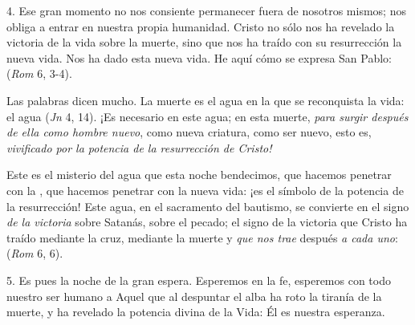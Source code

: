 \begin{body}
4. Ese gran momento no nos consiente permanecer fuera de nosotros mismos; nos obliga a entrar en nuestra propia humanidad. Cristo no sólo nos ha revelado la victoria de la vida sobre la muerte, sino que nos ha traído con su resurrección la nueva vida. Nos ha dado esta nueva vida. He aquí cómo se expresa San Pablo:  (\textit{Rom} 6, 3-4).

Las palabras  dicen mucho. La muerte es el agua en la que se reconquista la vida: el agua  (\textit{Jn} 4, 14). ¡Es necesario  en este agua; en esta muerte, \textit{para surgir después de ella como hombre nuevo}, como nueva criatura, como ser nuevo, esto es, \textit{vivificado por la potencia de la resurrección de Cristo!}

Este es el misterio del agua que esta noche bendecimos, que hacemos penetrar con la , que hacemos penetrar con la nueva vida: ¡es el símbolo de la potencia de la resurrección! Este agua, en el sacramento del bautismo, se convierte en el signo \textit{de la victoria} sobre Satanás, sobre el pecado; el signo de la victoria que Cristo ha traído mediante la cruz, mediante la muerte y \textit{que nos trae} después \textit{a cada uno}:  (\textit{Rom} 6, 6).

5. Es pues la noche de la gran espera. Esperemos en la fe, esperemos con todo nuestro ser humano a Aquel que al despuntar el alba ha roto la tiranía de la muerte, y ha revelado la potencia divina de la Vida: Él es nuestra esperanza.
\end{body}

